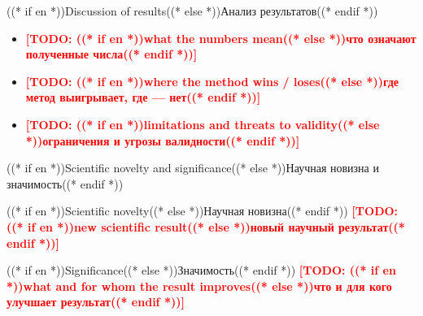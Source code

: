 \documentclass[aspectratio=169, 14pt]{beamer}
\newcommand{\todo}[1]{\textcolor{red}{\textbf{[TODO: #1]}}}
\begin{document}
\begin{frame}{((* if en *))Discussion of results((* else *))Анализ результатов((* endif *))}
  \begin{itemize}
    \item \todo{((* if en *))what the numbers mean((* else *))что означают полученные числа((* endif *))}
    \item \todo{((* if en *))where the method wins / loses((* else *))где метод выигрывает, где — нет((* endif *))}
    \item \todo{((* if en *))limitations and threats to validity((* else *))ограничения и угрозы валидности((* endif *))}
  \end{itemize}
\end{frame}

\begin{frame}{((* if en *))Scientific novelty and significance((* else *))Научная новизна и значимость((* endif *))}
  \begin{block}{((* if en *))Scientific novelty((* else *))Научная новизна((* endif *))}
    \todo{((* if en *))new scientific result((* else *))новый научный результат((* endif *))}
  \end{block}

  \vspace{0.4em}
  \begin{block}{((* if en *))Significance((* else *))Значимость((* endif *))}
    \todo{((* if en *))what and for whom the result improves((* else *))что и для кого улучшает результат((* endif *))}
  \end{block}
\end{frame}
\end{document}
